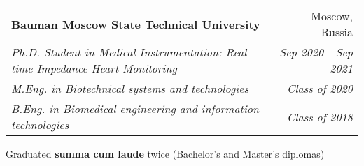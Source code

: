 \newcommand{\integratedResumeSubheading}[8]{
  \vspace{-2pt}\item
    \begin{tabular*}{0.97\textwidth}[t]{l@{\extracolsep{\fill}}r}
      \textbf{#1} & #2 \\
      \textit{\small#3} & \textit{\small #4} \\
      \textit{\small#5} & \textit{\small #6} \\
      \textit{\small#7} & \textit{\small #8} \\
    \end{tabular*}\vspace{-7pt}
}

\integratedResumeSubheading
{Bauman Moscow State Technical University}{Moscow, Russia}
{Ph.D. Student in Medical Instrumentation: Real-time Impedance Heart Monitoring}{Sep 2020 - Sep 2021}
{M.Eng. in Biotechnical systems and technologies}{Class of 2020}
{B.Eng. in Biomedical engineering and information technologies}{Class of 2018}
\begin{itemize}[leftmargin=0in, label={}]
    \small{\item{
        {Graduated \textbf{summa cum laude} twice (Bachelor's and Master's diplomas)}\\
    }}
\end{itemize}
